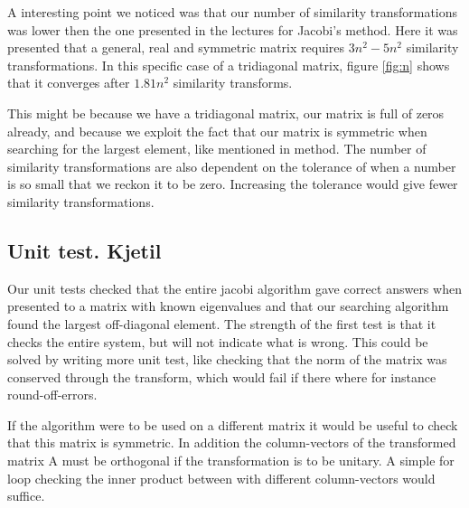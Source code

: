 A interesting point we noticed was that our number of similarity transformations was lower then the one presented in the lectures for Jacobi's method. Here it was presented that a general, real and symmetric matrix requires $ 3n^2-5n^2 $ similarity transformations. In this specific case of a  tridiagonal matrix, figure \ref{fig:n} shows that it converges after $ 1.81n^2 $ similarity transforms. 

  This might be because we have a tridiagonal matrix, our matrix is full of zeros already, and because we exploit the fact that our matrix is symmetric when searching for the largest element, like mentioned in method. The number of similarity transformations are also dependent on the tolerance of when a number is so small that we reckon it to be zero. Increasing the tolerance would give fewer similarity transformations. 
\subsection{Unit test. Kjetil}

Our unit tests checked that the entire jacobi algorithm gave correct answers when presented to a matrix with known eigenvalues and that our searching algorithm found the largest off-diagonal element. The strength of the first test is that it checks the entire system, but will not indicate what is wrong. This could be solved by writing more unit test, like checking that the norm of the matrix was conserved through the transform, which would fail if there where for instance round-off-errors.

If the algorithm were to be used on a different matrix it would be useful to check that this matrix is symmetric. In addition the column-vectors of the transformed matrix A must be orthogonal if the transformation is to be unitary. A simple for loop checking the inner product between with  different column-vectors would suffice. 

